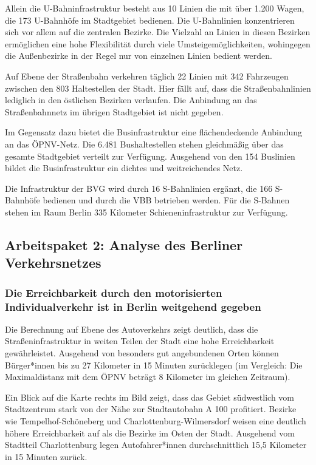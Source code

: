 Allein die U-Bahninfrastruktur besteht aus 10 Linien die mit über 1.200 Wagen, die 173 U-Bahnhöfe im Stadtgebiet bedienen. Die U-Bahnlinien konzentrieren sich vor allem auf die zentralen Bezirke. Die Vielzahl an Linien in diesen Bezirken ermöglichen eine hohe Flexibilität durch viele Umsteigemöglichkeiten, wohingegen die Außenbezirke in der Regel nur von einzelnen Linien bedient werden.

Auf Ebene der Straßenbahn verkehren täglich 22 Linien mit 342 Fahrzeugen zwischen den 803 Haltestellen der Stadt. Hier fällt auf, dass die Straßenbahnlinien lediglich in den östlichen Bezirken verlaufen. Die Anbindung an das Straßenbahnnetz im übrigen Stadtgebiet ist nicht gegeben.

Im Gegensatz dazu bietet die Businfrastruktur eine flächendeckende Anbindung an das ÖPNV-Netz. Die 6.481 Bushaltestellen stehen gleichmäßig über das gesamte Stadtgebiet verteilt zur Verfügung. Ausgehend von den 154 Buslinien bildet die Businfrastruktur ein dichtes und weitreichendes Netz.

Die Infrastruktur der BVG wird durch 16 S-Bahnlinien ergänzt, die 166 S-Bahnhöfe bedienen und durch die VBB betrieben werden. Für die S-Bahnen stehen im Raum Berlin 335 Kilometer Schieneninfrastruktur zur Verfügung.



\subsection{Arbeitspaket 2: Analyse des Berliner Verkehrsnetzes}

\subsubsection{Die Erreichbarkeit durch den motorisierten Individualverkehr ist in Berlin weitgehend gegeben}

Die Berechnung auf Ebene des Autoverkehrs zeigt deutlich, dass die Straßeninfrastruktur in weiten Teilen der Stadt eine hohe Erreichbarkeit gewährleistet. Ausgehend von besonders gut angebundenen Orten können Bürger*innen bis zu 27 Kilometer in 15 Minuten zurücklegen (im Vergleich: Die Maximaldistanz mit dem ÖPNV beträgt 8 Kilometer im gleichen Zeitraum).

Ein Blick auf die Karte rechts im Bild zeigt, dass das Gebiet südwestlich vom Stadtzentrum stark von der Nähe zur Stadtautobahn A 100 profitiert. Bezirke wie Tempelhof-Schöneberg und Charlottenburg-Wilmersdorf weisen eine deutlich höhere Erreichbarkeit auf als die Bezirke im Osten der Stadt. Ausgehend vom Stadtteil Charlottenburg legen Autofahrer*innen durchschnittlich 15,5 Kilometer in 15 Minuten zurück.

